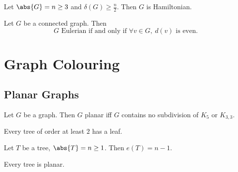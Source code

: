 \documentclass{article}
\begin{document}
\begin{nthm}\label{thm:17}
    Let $\abs{G} = n \geq 3$ and $\delta(G) \geq \frac{n}{2}$. Then $G$ is Hamiltonian.
\end{nthm}









\begin{nprop}\label{thm:18}
    Let $G$ be a connected graph. Then
    \begin{equation*}
        G\text{ Eulerian if and only if } \forall v \in G,\ d(v)\text{ is even.}
    \end{equation*}
\end{nprop}

\clearpage
\section{Graph Colouring}







\subsection{Planar Graphs}










\begin{nthm}\label{thm:19}
    Let $G$ be a graph. Then $G$ planar iff $G$ contains no subdivision of $K_5$ or $K_{3,3}$.
\end{nthm}





\begin{nprop}\label{prop:20}
    Every tree of order at least $2$ has a leaf.
\end{nprop}








\begin{nprop}\label{prop:21}
    Let $T$ be a tree, $\abs{T} = n \geq 1$. Then $e(T) = n-1$.
\end{nprop}

\begin{nprop}\label{prop:22}
    Every tree is planar.
\end{nprop}
\end{document}
